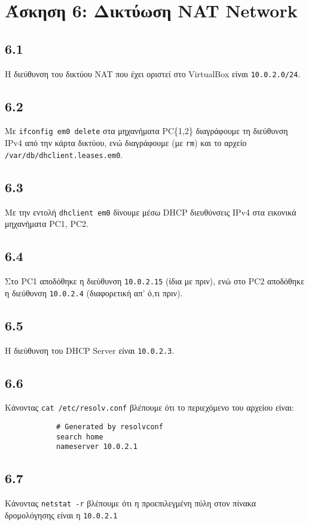 \documentclass[a4paper, 12pt]{article}
\begin{document}
\section*{Άσκηση 6:  Δικτύωση NAT Network}

	\subsection*{6.1}
		Η διεύθυνση του δικτύου NAT που έχει οριστεί στο VirtualBox είναι \verb|10.0.2.0/24|.

	\subsection*{6.2}
		Με \verb|ifconfig em0 delete| στα μηχανήματα PC\{1,2\} διαγράφουμε τη διεύθυνση IPv4 από την κάρτα δικτύου, ενώ διαγράφουμε (με \verb|rm|) και το αρχείο \verb|/var/db/dhclient.leases.em0|.

	\subsection*{6.3}
		Με την εντολή \verb|dhclient em0| δίνουμε μέσω DHCP διευθύνσεις IPv4 στα εικονικά μηχανήματα PC1, PC2.

	\subsection*{6.4}
		Στο PC1 αποδόθηκε η διεύθυνση \verb|10.0.2.15| (ίδια με πριν), ενώ στο PC2 αποδόθηκε η διεύθυνση \verb|10.0.2.4| (διαφορετική απ' ό,τι πριν).

	\subsection*{6.5}
		Η διεύθυνση του DHCP Server είναι \verb|10.0.2.3|.

	\subsection*{6.6}
		Κάνοντας \verb|cat /etc/resolv.conf| βλέπουμε ότι το περιεχόμενο του αρχείου είναι:
		
		\begin{verbatim}
			# Generated by resolvconf
			search home
			nameserver 10.0.2.1
		\end{verbatim}

	\subsection*{6.7}
		Κάνοντας \verb|netstat -r| βλέπουμε ότι η προεπιλεγμένη πύλη στον πίνακα δρομολόγησης είναι η \verb|10.0.2.1|
\end{document}
